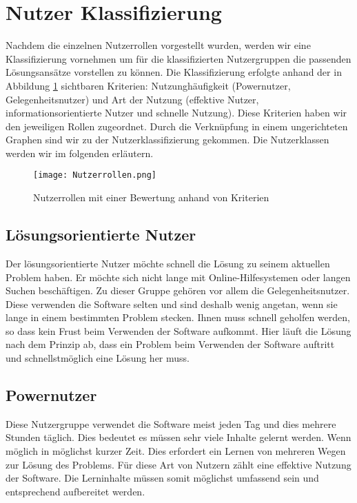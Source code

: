 \section{Nutzer Klassifizierung}
Nachdem die einzelnen Nutzerrollen vorgestellt wurden, werden wir eine Klassifizierung vornehmen um für die klassifizierten Nutzergruppen die passenden Lösungsansätze vorstellen zu können. Die Klassifizierung erfolgte anhand der in Abbildung \ref{img1:userRoles} sichtbaren Kriterien: Nutzunghäufigkeit (Powernutzer, Gelegenheitsnutzer) und Art der Nutzung (effektive Nutzer, informationsorientierte Nutzer und schnelle Nutzung). Diese Kriterien haben wir den jeweiligen Rollen zugeordnet. Durch die Verknüpfung in einem ungerichteten Graphen sind wir zu der Nutzerklassifizierung gekommen. Die Nutzerklassen werden wir im folgenden erläutern.
\begin{figure}[ht]
\begin{center}
\texttt{[image: Nutzerrollen.png]}
\caption{Nutzerrollen mit einer Bewertung anhand von Kriterien}
\label{img1:userRoles}
\end{center}
\end{figure} 

\subsection{Lösungsorientierte Nutzer}
Der lösungsorientierte Nutzer möchte schnell die Lösung zu seinem aktuellen Problem haben. Er möchte sich nicht lange mit Online-Hilfesystemen oder langen Suchen beschäftigen. Zu dieser Gruppe gehören vor allem die Gelegenheitsnutzer. Diese verwenden die Software selten und sind deshalb wenig angetan, wenn sie lange in einem bestimmten Problem stecken. Ihnen muss schnell geholfen werden, so dass kein Frust beim Verwenden der Software aufkommt. Hier läuft die Lösung nach dem Prinzip ab, dass ein Problem beim Verwenden der Software auftritt und schnellstmöglich eine Lösung her muss. 
\subsection{Powernutzer}
Diese Nutzergruppe verwendet die Software meist jeden Tag und dies mehrere Stunden täglich. Dies bedeutet es müssen sehr viele Inhalte gelernt werden. Wenn möglich in möglichst kurzer Zeit. Dies erfordert ein Lernen von mehreren Wegen zur Lösung des Problems. Für diese Art von Nutzern zählt eine effektive Nutzung der Software. Die Lerninhalte müssen somit möglichst umfassend sein und entsprechend aufbereitet werden. 

